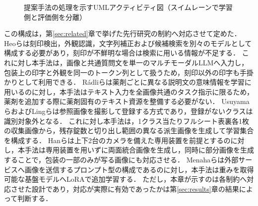 \documentclass[uplatex,dvipdfmx]{jsarticle}
\begin{document}
\begin{figure}[htbp]
  \caption{提案手法の処理を示すUMLアクティビティ図（スイムレーンで学習側と評価側を分離）}
  \label{fig:pipeline}
\end{figure}

この構成は，第\ref{sec:related}章で挙げた先行研究の制約へ対応させて定めた．
Heoらは刻印検出，外観認識，文字列補正および候補検索を別々のモデルとして構成する必要があり，刻印が不鮮明な場合は検索に用いる情報が不足する\cite{heo2023pill}．
これに対し本手法は，画像と共通質問文を単一のマルチモーダルLLMへ入力し，包装上の印字と外観を同一のトークン列として扱うため，刻印以外の印字も手掛かりとして利用できる．
Rádliらは薬剤ごとに異なる説明文の意味情報を学習に用いる\cite{radli2024word,radli2024metric}のに対し，本手法はテキスト入力を全画像共通のタスク指示に限るため，薬剤を追加する際に薬剤固有のテキスト資源を整備する必要がない．
UsuyamaらおよびLingらは参照画像を撮影して登録する方式であり，登録がないクラスは識別対象外となる\cite{usuyama2020epillid,ling2020fewshot}．
これに対し本手法は，1クラス当たりフルシート表裏各1枚の収集画像から，残存錠数と切り出し範囲の異なる派生画像を生成して学習集合を構成する．
Hanらは上下2台のカメラを備えた専用装置を前提とする\cite{han2021blister}のに対し，本手法は専用装置を用いずに両面統合画像を生成し，同時に部分画像を生成することで，包装の一部のみが写る画像にも対応させる．
Menahaらは外部サービスへ画像を送信するプロンプト型の構成である\cite{menaha2024gemini}のに対し，本手法は重みを取得可能な基盤モデルへLoRAで追加学習する．
ただし，本章が示すのは各制約へ対応させた設計であり，対応が実際に有効であったかは第\ref{sec:results}章の結果によって判断する．
\end{document}
